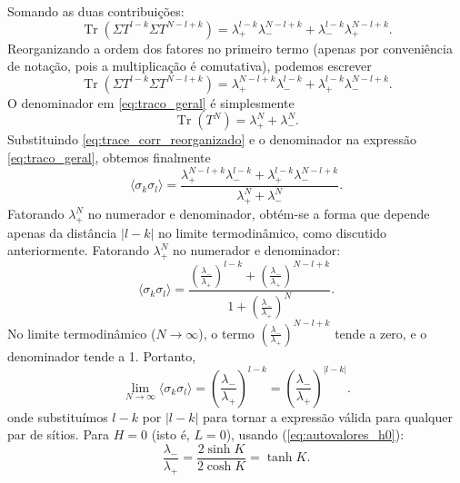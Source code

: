 \documentclass[11pt,a4paper]{article}
\begin{document}
%
Somando as duas contribuições:
%
\begin{equation}
\operatorname{Tr}\left( \Sigma T^{l-k} \Sigma T^{N-l+k} \right)
= \lambda_+^{l-k} \lambda_-^{N-l+k} + \lambda_-^{l-k} \lambda_+^{N-l+k}.
\label{eq:trace_corr_calculado}
\end{equation}
%
Reorganizando a ordem dos fatores no primeiro termo (apenas por conveniência de notação, pois a multiplicação é comutativa), podemos escrever
%
\begin{equation}
\operatorname{Tr}\left( \Sigma T^{l-k} \Sigma T^{N-l+k} \right)
= \lambda_+^{N-l+k} \lambda_-^{l-k} + \lambda_+^{l-k} \lambda_-^{N-l+k}.
\label{eq:trace_corr_reorganizado}
\end{equation}
%
O denominador em \eqref{eq:traco_geral} é simplesmente
%
\begin{equation}
\operatorname{Tr}\left( T^N \right) = \lambda_+^N + \lambda_-^N.
\end{equation}
%
Substituindo \eqref{eq:trace_corr_reorganizado} e o denominador na expressão \eqref{eq:traco_geral}, obtemos finalmente
%
\begin{equation}
\boxed{
\langle \sigma_k \sigma_l \rangle
= \frac{ \lambda_+^{N-l+k} \lambda_-^{l-k} + \lambda_+^{l-k} \lambda_-^{N-l+k} }{ \lambda_+^N + \lambda_-^N }.
}
\label{eq:corr_final_passos}
\end{equation}
%
Fatorando $\lambda_+^N$ no numerador e denominador, obtém-se a forma que depende apenas da distância $|l-k|$ no limite termodinâmico, como discutido anteriormente. Fatorando $\lambda_+^N$ no numerador e denominador:
%
\begin{equation}
\langle \sigma_k \sigma_l \rangle
= \frac{ \left( \frac{\lambda_-}{\lambda_+} \right)^{l-k} + \left( \frac{\lambda_-}{\lambda_+} \right)^{N-l+k} }
{ 1 + \left( \frac{\lambda_-}{\lambda_+} \right)^N }.
\end{equation}
%
No limite termodinâmico ($N \to \infty$), o termo $\left( \frac{\lambda_-}{\lambda_+} \right)^{N-l+k}$ tende a zero, e o denominador tende a 1. Portanto,
%
\begin{equation}
\boxed{
\lim_{N \to \infty} \langle \sigma_k \sigma_l \rangle
= \left( \frac{\lambda_-}{\lambda_+} \right)^{l-k}
= \left( \frac{\lambda_-}{\lambda_+} \right)^{|l-k|}
}.
\label{eq:correlacao_geral}
\end{equation}
%
onde substituímos $l-k$ por $|l-k|$ para tornar a expressão válida para qualquer par de sítios.
%
Para $H = 0$ (isto é, $L = 0$), usando (\ref{eq:autovalores_h0}):
%
\begin{equation}
\frac{\lambda_-}{\lambda_+}
= \frac{2\sinh K}{2\cosh K}
= \tanh K.
\end{equation}
\end{document}
